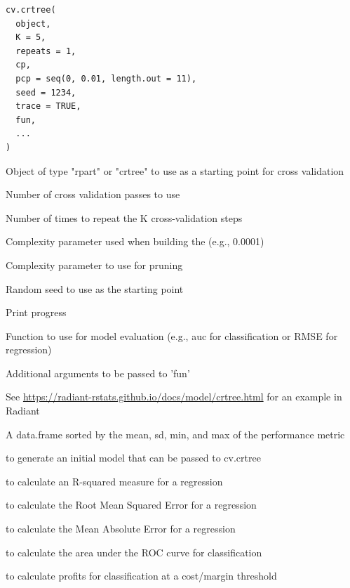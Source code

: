 \documentclass[a4paper]{book}
\begin{document}
%
\begin{Usage}
\begin{verbatim}
cv.crtree(
  object,
  K = 5,
  repeats = 1,
  cp,
  pcp = seq(0, 0.01, length.out = 11),
  seed = 1234,
  trace = TRUE,
  fun,
  ...
)
\end{verbatim}
\end{Usage}
%
\begin{Arguments}
\begin{ldescription}
\item[\code{object}] Object of type "rpart" or "crtree" to use as a starting point for cross validation

\item[\code{K}] Number of cross validation passes to use

\item[\code{repeats}] Number of times to repeat the K cross-validation steps

\item[\code{cp}] Complexity parameter used when building the (e.g., 0.0001)

\item[\code{pcp}] Complexity parameter to use for pruning

\item[\code{seed}] Random seed to use as the starting point

\item[\code{trace}] Print progress

\item[\code{fun}] Function to use for model evaluation (e.g., auc for classification or RMSE for regression)

\item[\code{...}] Additional arguments to be passed to 'fun'
\end{ldescription}
\end{Arguments}
%
\begin{Details}
See \url{https://radiant-rstats.github.io/docs/model/crtree.html} for an example in Radiant
\end{Details}
%
\begin{Value}
A data.frame sorted by the mean, sd, min, and max of the performance metric
\end{Value}
%
\begin{SeeAlso}
 to generate an initial model that can be passed to cv.crtree

 to calculate an R-squared measure for a regression

 to calculate the Root Mean Squared Error for a regression

 to calculate the Mean Absolute Error for a regression

 to calculate the area under the ROC curve for classification

 to calculate profits for classification at a cost/margin threshold
\end{SeeAlso}
\end{document}
